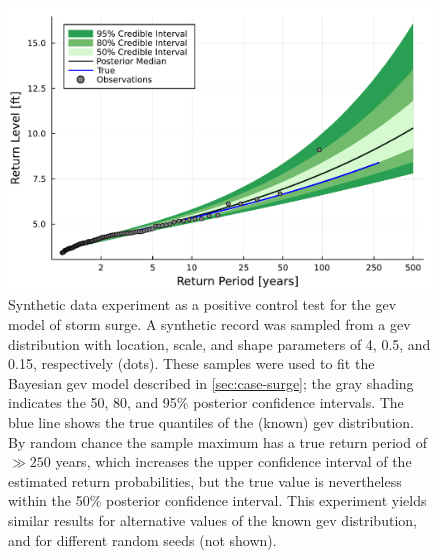 \documentclass[11pt]{article}
\begin{document}
\begin{figure}
    \centering
    \includegraphics[width=\textwidth]{surge-synthetic-data-experiment}
    \caption{
        Synthetic data experiment as a positive control test for the \gls{gev} model of storm surge.
        A synthetic record was sampled from a \gls{gev} distribution with location, scale, and shape parameters of 4, 0.5, and 0.15, respectively (dots).
        These samples were used to fit the Bayesian \gls{gev} model described in \cref{sec:case-surge}; the gray shading indicates the 50, 80, and 95\% posterior confidence intervals.
        The blue line shows the true quantiles of the (known) \gls{gev} distribution.
        By random chance the sample maximum has a true return period of $\gg 250$ years, which increases the upper confidence interval of the estimated return probabilities, but the true value is nevertheless within the 50\% posterior confidence interval.
        This experiment yields similar results for alternative values of the known \gls{gev} distribution, and for different random seeds (not shown).
    }\label{fig:surge-synthetic-data-experiment}
\end{figure}
\end{document}
